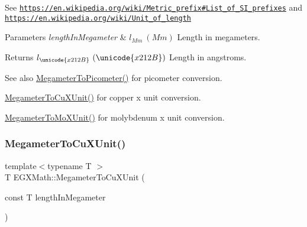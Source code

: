 See \href{https://en.wikipedia.org/wiki/Metric_prefix#List_of_SI_prefixes}{\tt https\+://en.\+wikipedia.\+org/wiki/\+Metric\+\_\+prefix\#\+List\+\_\+of\+\_\+\+S\+I\+\_\+prefixes} and \href{https://en.wikipedia.org/wiki/Unit_of_length}{\tt https\+://en.\+wikipedia.\+org/wiki/\+Unit\+\_\+of\+\_\+length} 
\begin{DoxyParams}{Parameters}
{\em length\+In\+Megameter} & $ l_{Mm}\ (Mm)$ Length in megameters. \\
\hline
\end{DoxyParams}
\begin{DoxyReturn}{Returns}
$ l_{\unicode{x212B}}\ (\unicode{x212B})$ Length in angstroms. 
\end{DoxyReturn}
\begin{DoxySeeAlso}{See also}
\mbox{\hyperlink{group___e_g_x_math-_conversions-_length_conversions-_megameter-_s_i_ga0f6585bdcd16b6748b6c4d9116dd955c}{Megameter\+To\+Picometer()}} for picometer conversion. 

\mbox{\hyperlink{group___e_g_x_math-_conversions-_length_conversions-_megameter-_non-_s_i_gae44ce2fd3e740a5aec1546ed10c83447}{Megameter\+To\+Cu\+X\+Unit()}} for copper x unit conversion. 

\mbox{\hyperlink{group___e_g_x_math-_conversions-_length_conversions-_megameter-_non-_s_i_ga134a9fb2603b93c739c4ee58864f69c6}{Megameter\+To\+Mo\+X\+Unit()}} for molybdenum x unit conversion. 
\end{DoxySeeAlso}
\mbox{\label{group___e_g_x_math-_conversions-_length_conversions-_megameter-_non-_s_i_gae44ce2fd3e740a5aec1546ed10c83447}} 
\subsubsection{\texorpdfstring{Megameter\+To\+Cu\+X\+Unit()}{MegameterToCuXUnit()}}
{\footnotesize\ttfamily template$<$typename T $>$ \\
T E\+G\+X\+Math\+::\+Megameter\+To\+Cu\+X\+Unit (\begin{DoxyParamCaption}\item[{const T}]{length\+In\+Megameter }\end{DoxyParamCaption})}




